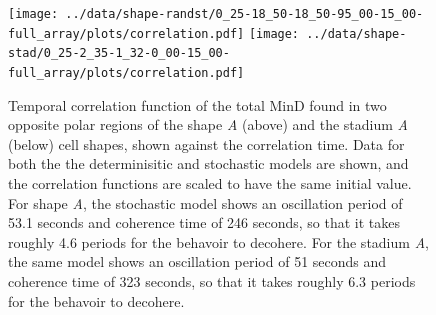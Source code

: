 \documentclass{pnastwo}
\begin{document}
\begin{figure}
  \texttt{[image: ../data/shape-randst/0\_25-18\_50-18\_50-95\_00-15\_00-full\_array/plots/correlation.pdf]}
  \texttt{[image: ../data/shape-stad/0\_25-2\_35-1\_32-0\_00-15\_00-full\_array/plots/correlation.pdf]}
  \caption{Temporal correlation function of the total MinD found in
    two opposite polar regions of the shape \emph{A} (above) and the
    stadium \emph{A} (below) cell shapes, shown against the
    correlation time.  Data for both the the determinisitic and
    stochastic models are shown, and the correlation functions are
    scaled to have the same initial value.  For shape \emph{A}, the
    stochastic model shows an oscillation period of 53.1 seconds and
    coherence time of 246 seconds, so that it takes roughly 4.6 periods
    for the behavoir to decohere.  For the stadium \emph{A}, the same
    model shows an oscillation period of 51 seconds and coherence time of
    323 seconds, so that it takes roughly 6.3 periods for the behavoir
    to decohere.}
  \label{fig:corr-pancake-A}
\end{figure}
\end{document}
